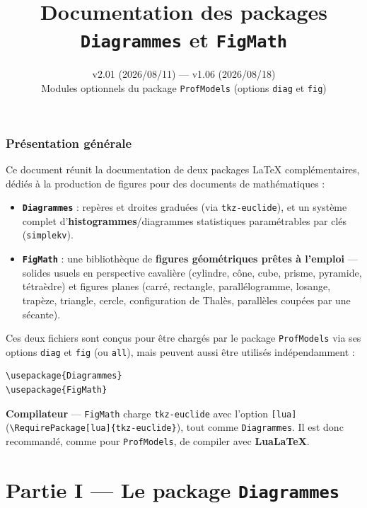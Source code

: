 \documentclass[11pt,a4paper]{article}
\title{\Huge\bfseries\color{pfmblue} Documentation des packages\\[2pt] \texttt{Diagrammes} et \texttt{FigMath}}
\author{}
\date{\pkg{Diagrammes} v2.01 (2026/08/11) \quad---\quad \pkg{FigMath} v1.06 (2026/08/18)\\
Modules optionnels du package \texttt{ProfModels} (options \texttt{diag} et \texttt{fig})}
\newcommand{\pkg}[1]{\texttt{#1}}
\begin{document}
\maketitle
\thispagestyle{empty}

\tableofcontents
\newpage

\section{Présentation générale}

Ce document réunit la documentation de deux packages LaTeX complémentaires, dédiés à la production de figures pour des documents de mathématiques :

\begin{itemize}
  \item \textbf{\pkg{Diagrammes}} : repères et droites graduées (via \pkg{tkz-euclide}), et un système complet d'\textbf{histogrammes}/diagrammes statistiques paramétrables par clés (\pkg{simplekv}).
  \item \textbf{\pkg{FigMath}} : une bibliothèque de \textbf{figures géométriques prêtes à l'emploi} — solides usuels en perspective cavalière (cylindre, cône, cube, prisme, pyramide, tétraèdre) et figures planes (carré, rectangle, parallélogramme, losange, trapèze, triangle, cercle, configuration de Thalès, parallèles coupées par une sécante).
\end{itemize}

Ces deux fichiers sont conçus pour être chargés par le package \texttt{ProfModels} via ses options \texttt{diag} et \texttt{fig} (ou \texttt{all}), mais peuvent aussi être utilisés indépendamment :

\begin{lstlisting}
\usepackage{Diagrammes}
\usepackage{FigMath}
\end{lstlisting}

\begin{avertissement}
\textbf{Compilateur} — \pkg{FigMath} charge \texttt{tkz-euclide} avec l'option \texttt{[lua]} (\texttt{\textbackslash RequirePackage[lua]\{tkz-euclide\}}), tout comme \pkg{Diagrammes}. Il est donc recommandé, comme pour \pkg{ProfModels}, de compiler avec \textbf{LuaLaTeX}.
\end{avertissement}

\part*{Partie I --- Le package \texttt{Diagrammes}}
\end{document}
